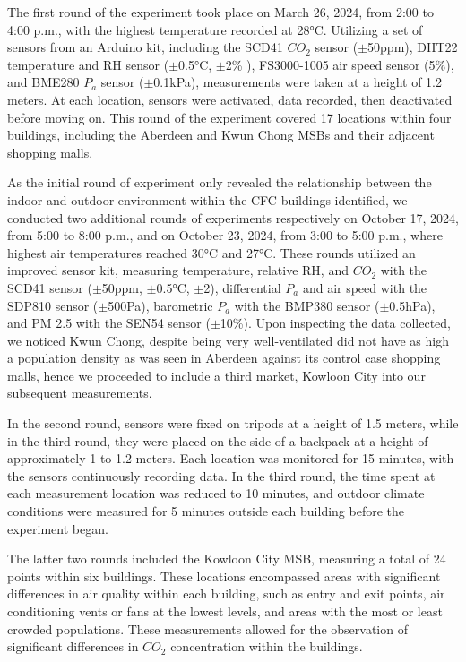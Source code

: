 \documentclass[preprint,12pt]{elsarticle}
\begin{document}
    The first round of the experiment took place on March 26, 2024, from 2:00 to 4:00 p.m., with the highest temperature recorded at 28°C. Utilizing a set of sensors from an Arduino kit\cite{30}, including the SCD41 $CO_2$ sensor ($\pm$50ppm), DHT22 temperature and RH sensor ($\pm$0.5°C, $\pm$2\% ), FS3000-1005 air speed sensor (5\%), and BME280 $P_a$ sensor ($\pm$0.1kPa), measurements were taken at a height of 1.2 meters\cite{31}. At each location, sensors were activated, data recorded, then deactivated before moving on. This round of the experiment covered 17 locations within four buildings, including the Aberdeen and Kwun Chong MSBs and their adjacent shopping malls.
    
    As the initial round of experiment only revealed the relationship between the indoor and outdoor environment within the CFC buildings identified, we conducted two additional rounds of experiments respectively on October 17, 2024, from 5:00 to 8:00 p.m., and on October 23, 2024, from 3:00 to 5:00 p.m., where highest air temperatures reached 30°C and 27°C. These rounds utilized an improved sensor kit, measuring temperature, relative RH, and $CO_2$ with the SCD41 sensor ($\pm$50ppm, $\pm$0.5°C, $\pm$2), differential $P_a$ and air speed with the SDP810 sensor ($\pm$500Pa), barometric $P_a$ with the BMP380 sensor ($\pm$0.5hPa), and PM 2.5 with the SEN54 sensor ($\pm$10\%). Upon inspecting the data collected, we noticed Kwun Chong, despite being very well-ventilated did not have as high a population density as was seen in Aberdeen against its control case shopping malls, hence we proceeded to include a third market, Kowloon City into our subsequent measurements.
    
    In the second round, sensors were fixed on tripods at a height of 1.5 meters, while in the third round, they were placed on the side of a backpack at a height of approximately 1 to 1.2 meters\cite{32}. Each location was monitored for 15 minutes, with the sensors continuously recording data. In the third round, the time spent at each measurement location was reduced to 10 minutes, and outdoor climate conditions were measured for 5 minutes outside each building before the experiment began.
    
    The latter two rounds included the Kowloon City MSB, measuring a total of 24 points within six buildings. These locations encompassed areas with significant differences in air quality within each building\cite{33}, such as entry and exit points, air conditioning vents or fans at the lowest levels, and areas with the most or least crowded populations. These measurements allowed for the observation of significant differences in $CO_2$ concentration within the buildings.
    
\end{document}
